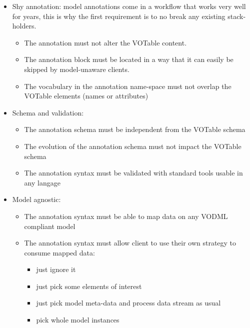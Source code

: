 \begin {itemize}
  \item Shy annotation: model annotations come in a workflow that works very well for years, this is why the first requirement is to no break any existing stack-holders.
  \begin {itemize}
    \item The annotation must not alter the VOTable content.
    \item The annotation block must be located in a way that it can easily be skipped by model-unaware clients.
    \item The vocabulary in the annotation name-space must not overlap the VOTable elements (names or attributes)    
  \end {itemize}
  
  \item Schema and validation:
  \begin {itemize}
    \item The annotation schema must be independent from the VOTable schema
    \item The evolution of the annotation schema must not impact the VOTable schema
    \item The annotation syntax must be validated with standard tools usable in any langage
  \end {itemize}
  
  \item Model agnostic:
  \begin {itemize}
    \item The annotation syntax must be able to map data on any VODML compliant model
    \item The annotation syntax must allow client to use their own strategy to consume mapped data:
      \begin {itemize}
        \item just ignore it
        \item just pick some elements of interest 
        \item just pick model meta-data and process data stream as usual
        \item pick whole model instances
      \end {itemize}
  \end {itemize}
  
\end {itemize}
